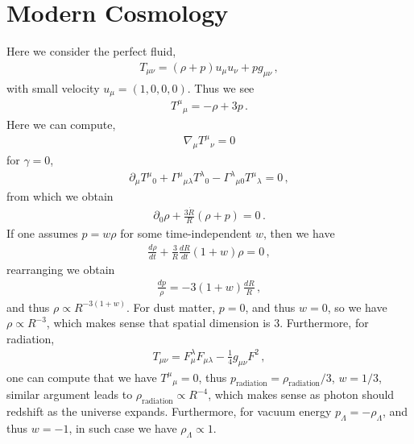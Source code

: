 \documentclass[11pt, onesided]{book}
\theoremstyle{break}
\theoremstyle{break}
\newcommand{\pd}{\partial}
\begin{document}
\section[Modern Cosmology]{\color{red} Modern Cosmology\color{black}}
Here we consider the perfect fluid,
\begin{align*}
T_{\mu\nu} = (\rho + p) u_\mu u_\nu + p g_{\mu\nu}\,,
\end{align*}
with small velocity $u_\mu = (1,0,0,0)$. Thus we see
\begin{align*}
T^\mu{}_\mu = -\rho + 3p\,.
\end{align*}
Here we can compute, 
\begin{align*}
\nabla_\mu T^\mu{}_\nu = 0
\end{align*}
for $\gamma = 0$,
\begin{align*}
\pd_\mu T^\mu{}_0 + \Gamma^\mu{}_{\mu \lambda}T^\lambda{}_0 - \Gamma^\lambda{}_{\mu 0}T^\mu{}_\lambda = 0\,,
\end{align*}
from which we obtain
\begin{align*}
\pd_0 \rho + \frac{3\dot{R}}{R}\left( \rho + p\right) = 0\,.
\end{align*}
If one assumes $p = w\rho$ for some time-independent $w$, then we have
\begin{align*}
\frac{d\rho}{dt} + \frac{3}{R}\frac{dR}{dt}\left(1 + w\right) \rho = 0\,,
\end{align*}
rearranging we obtain
\begin{align*}
\frac{dp}{\rho} = -3(1+w) \frac{dR}{R}\,,
\end{align*}
and thus $\rho \propto R^{-3(1+w)}$. For dust matter, $p =0$, and thus $w = 0$, so we have $\rho \propto R^{-3}$, which makes sense that spatial dimension is $3$. Furthermore, for radiation, 
\begin{align*}
T_{\mu\nu} = F_\mu^\lambda F_{\mu\lambda} - \frac{1}{4}g_{\mu \nu}F^2\,,
\end{align*}
one can compute that we have $T^\mu{}_\mu = 0$, thus $p_{\text{radiation}} = \rho_{\text{radiation}}/3$, $w = 1/3$, similar argument leads to $\rho_{\text{radiation}}\propto R^{-4}$, which makes sense as photon should redshift as the universe expands. Furthermore, for vacuum energy $p_\Lambda = -\rho_\Lambda$, and thus $w = -1$, in such case we have $\rho_\Lambda \propto 1$. \\
\end{document}

